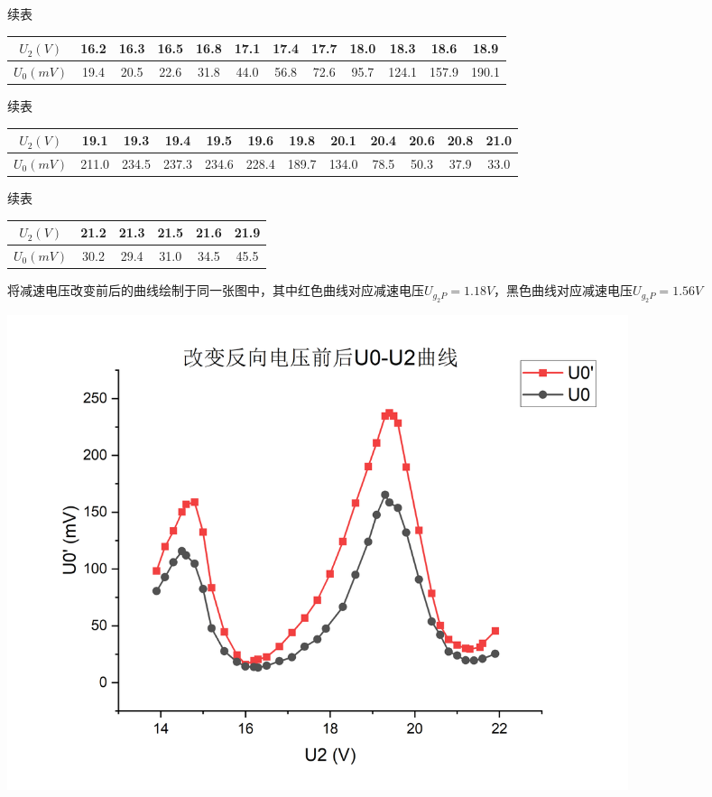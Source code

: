 \documentclass{article}
\begin{document}
    续表

    \begin{center}
        \begin{tabular}{|c|c|c|c|c|c|c|c|c|c|c|c|}
            \hline
            $U_2(V)$ & 16.2  & 16.3  & 16.5  & 16.8  & 17.1  & 17.4  & 17.7  & 18.0  & 18.3  & 18.6  & 18.9  \bigstrut\\
            \hline
            $U_0(mV)$ & 19.4  & 20.5  & 22.6  & 31.8  & 44.0  & 56.8  & 72.6  & 95.7  & 124.1  & 157.9  & 190.1  \bigstrut\\
            \hline
        \end{tabular}%
    \end{center}

    续表

    \begin{center}
        \begin{tabular}{|c|c|c|c|c|c|c|c|c|c|c|c|}
            \hline
            $U_2(V)$ & 19.1  & 19.3  & 19.4  & 19.5  & 19.6  & 19.8  & 20.1  & 20.4  & 20.6  & 20.8  & 21.0  \bigstrut\\
            \hline
            $U_0(mV)$ & 211.0  & 234.5  & 237.3  & 234.6  & 228.4  & 189.7  & 134.0  & 78.5  & 50.3  & 37.9  & 33.0  \bigstrut\\
            \hline
        \end{tabular}%
    \end{center}

    续表

    \begin{center}
        \begin{tabular}{|c|c|c|c|c|c|}
            \hline
            $U_2(V)$ & 21.2  & 21.3  & 21.5  & 21.6  & 21.9  \bigstrut\\
            \hline
            $U_0(mV)$ & 30.2  & 29.4  & 31.0  & 34.5  & 45.5  \bigstrut\\
            \hline
        \end{tabular}%
    \end{center}

    将减速电压改变前后的曲线绘制于同一张图中，其中红色曲线对应减速电压$U_{g_2P}=1.18V$，黑色曲线对应减速电压$U_{g_2P}=1.56V$

    \begin{center}
        \includegraphics[width=0.8\textwidth]{reverse.jpg}
    \end{center}
\end{document}
